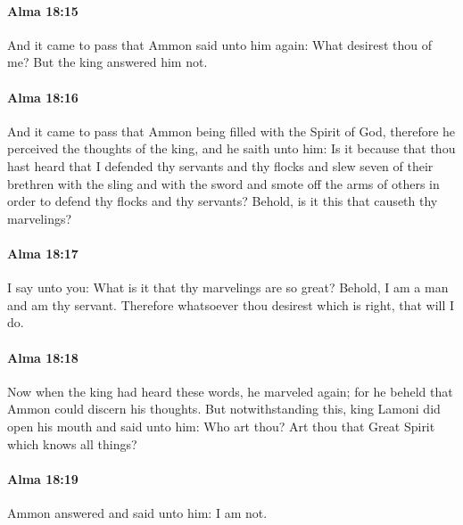		\paragraph{Alma 18:15} %
			\label{ALMA-18-15}

			And it came to pass that Ammon said unto him again:
			What desirest thou of me?
			But the king answered him not.

		\paragraph{Alma 18:16} %
			\label{ALMA-18-16}

			And it came to pass that Ammon being filled with the Spirit of God,
			therefore he perceived the thoughts of the king,
			and he saith unto him:
			Is it because that thou hast heard
			that I defended thy servants and thy flocks
			and slew seven of their brethren with the sling and with the sword
			and smote off the arms of others
			in order to defend thy flocks and thy servants?
			Behold, is it this that causeth thy marvelings?

		\paragraph{Alma 18:17} %
			\label{ALMA-18-17}

			I say unto you:
			What is it that thy marvelings are so great?
			Behold, I am a man and am thy servant.
			Therefore whatsoever thou desirest which is right, that will I do.

		\paragraph{Alma 18:18} %
			\label{ALMA-18-18}

			Now when the king had heard these words, he marveled again;
			for he beheld that Ammon could discern his thoughts.
			But notwithstanding this, king Lamoni did open his mouth and said unto him:
			Who art thou?
			Art thou that Great Spirit which knows all things?

		\paragraph{Alma 18:19} %
			\label{ALMA-18-19}

			Ammon answered and said unto him:
			I am not.

